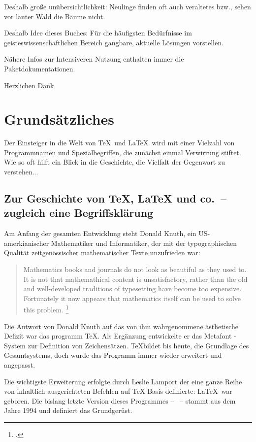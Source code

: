 \documentclass[draft=false,11pt,DIV=8]{scrbook}  	%
\begin{document}
Deshalb große unübersichtlichkeit: Neulinge finden oft auch veraltetes bzw., sehen vor lauter
Wald die Bäume nicht.

Deshalb Idee dieses Buches: Für die häufigsten Bedürfnisse im geisteswissenschaftlichen
Bereich gangbare, aktuelle Lösungen vorstellen.

Nähere Infos zur Intensiveren Nutzung enthalten immer die Paketdokumentationen.

Herzlichen Dank 

\tableofcontents

\chapter{Grundsätzliches}

Der Einsteiger in die Welt von \TeX\ und \LaTeX\ wird mit einer Vielzahl von Programmnamen und 
Spezialbegriffen, die zunächst einmal Verwirrung stiftet. 
Wie so oft hilft ein Blick in die Geschichte, die Vielfalt der Gegenwart zu verstehen...


\section{Zur Geschichte von \TeX{}, \LaTeX{} und co.\ -- zugleich eine Begriffsklärung}

Am Anfang der gesamten Entwicklung steht Donald Knuth, ein US-amerkianischer Mathematiker und 
Informatiker, der mit der typographischen Qualität zeitgenössischer mathematischer Texte 
unzufrieden war:

\begin{quote}
 Mathematics books and journals do not look as beautiful as they used to.
 It is not that mathemathical content is unsatisfactory, rather than the old and 
 well-developed traditions of typesetting have become too expensive.
 Fortunately it now appears that mathematics itself can be used to solve this problem.%
 \footcite[Zitiert nach: ][S.~1]{voss:einfuehrung}
\end{quote}

Die Antwort von Donald Knuth auf das von ihm wahrgenommene ästhetische Defizit war das  
programm \TeX . Als Ergänzung entwickelte er das Metafont -System zur Definition von 
Zeichensätzen.
\TeX bildet bis heute, die Grundlage des Gesamtsystems, doch wurde das Programm immer 
wieder erweitert und angepasst.

Die wichtigste Erweiterung erfolgte durch Leslie Lamport der eine ganze Reihe von 
inhaltlich ausgerichteten Befehlen auf \TeX -Basis definierte: \LaTeX\ war geboren.
Die bislang letzte Version dieses Programmes -- \LaTeXe\ -- stammt aus dem Jahre 1994
und definiert das Grundgerüst.
\end{document}
